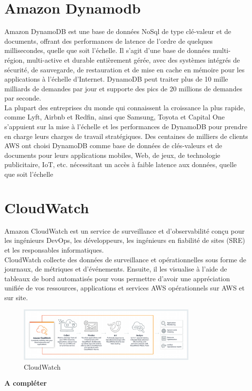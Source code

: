 
\section{Amazon Dynamodb}
Amazon DynamoDB est une base de données NoSql de type clé-valeur et de documents, offrant des performances de latence de l’ordre de quelques millisecondes, quelle que soit l’échelle. Il s’agit d’une base
de données multi-région, multi-active et durable entièrement gérée, avec des systèmes intégrés de sécurité,
de sauvegarde, de restauration et de mise en cache en mémoire pour les applications à l’échelle d’Internet.
DynamoDB peut traiter plus de 10 mille milliards de demandes par jour et supporte des pics de 20 millions
de demandes par seconde.\\

La plupart des entreprises du monde qui connaissent la croissance la plus rapide, comme Lyft, Airbnb et
Redfin, ainsi que Samsung, Toyota et Capital One s’appuient sur la mise à l’échelle et les performances de
DynamoDB pour prendre en charge leurs charges de travail stratégiques.
Des centaines de milliers de clients AWS ont choisi DynamoDB comme base de données de clés-valeurs et
de documents pour leurs applications mobiles, Web, de jeux, de technologie publicitaire, IoT, etc. nécessitant un accès à faible latence aux données, quelle que soit l’échelle

\section{CloudWatch}
Amazon CloudWatch est un service de surveillance et d'observabilité conçu pour les ingénieurs DevOps, les développeurs, les ingénieurs en fiabilité de sites (SRE) et les responsables informatiques. \\

CloudWatch collecte des données de surveillance et opérationnelles sous forme de journaux, de métriques et d'événements. Ensuite, il les visualise à l'aide de tableaux de bord automatisés pour vous permettre d’avoir une appréciation unifiée de vos ressources, applications et services AWS opérationnels sur AWS et sur site.
 \begin{figure}[!th]
            \centering
                \includegraphics[width=0.8\textwidth]{Figures/cloudwatch}
	       \decoRule
		\caption[CloudWatch]{CloudWatch}
	\label{fig:CloudWatch}
	\end{figure}
\textbf{A compléter}
